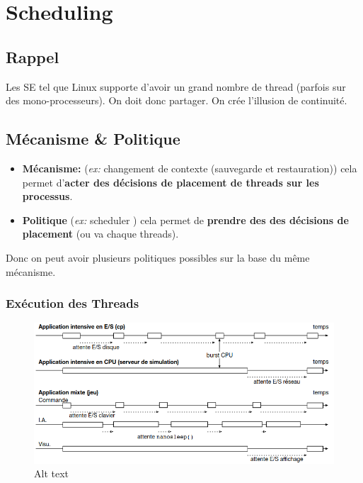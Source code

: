 \section{Scheduling}\label{scheduling}

\subsection{Rappel}\label{rappel}

Les SE tel que Linux supporte d'avoir un grand nombre de thread (parfois
sur des mono-processeurs). On doit donc partager. On crée l'illusion de
continuité.

\subsection{Mécanisme \& Politique}\label{muxe9canisme-politique}

\begin{itemize}
\tightlist
\item
  \textbf{Mécanisme:} (\emph{ex:} changement de contexte (sauvegarde et
  restauration)) cela permet d'\textbf{acter des décisions de placement
  de threads sur les processus}.
\item
  \textbf{Politique} (\emph{ex:} scheduler ) cela permet de
  \textbf{prendre des des décisions de placement} (ou va chaque
  threads).
\end{itemize}

Donc on peut avoir plusieurs politiques possibles sur la base du même
mécanisme.

\subsubsection{Exécution des Threads}\label{exuxe9cution-des-threads}

\begin{figure}
\centering
\includegraphics{image-28.png}
\caption{Alt text}
\end{figure}

